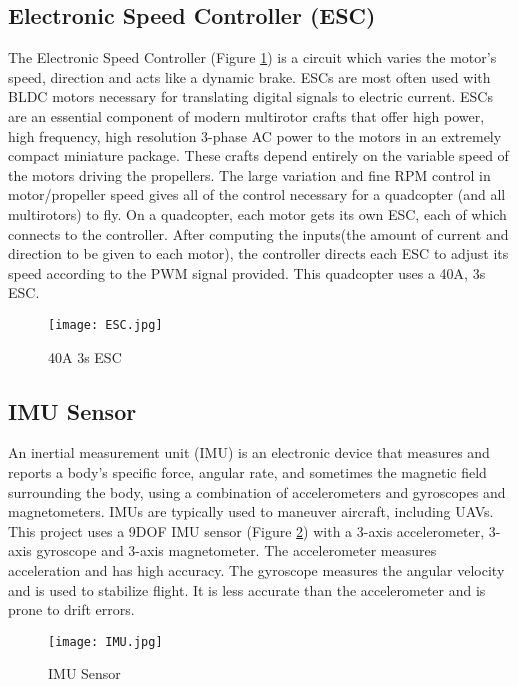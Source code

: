 \subsection{Electronic Speed Controller (ESC)}
The Electronic Speed Controller (Figure \ref{ESC}) is a circuit which varies the motor's speed, direction and acts like a dynamic brake. ESCs are most often used with BLDC motors necessary for translating digital signals to electric current. ESCs are an essential component of modern multirotor crafts that offer high power, high frequency, high resolution 3-phase AC power to the motors in an extremely compact miniature package. These crafts depend entirely on the variable speed of the motors driving the propellers. 
\newline
\newline
The large variation and fine RPM control in motor/propeller speed gives all of the control necessary for a quadcopter (and all multirotors) to fly. On a quadcopter, each motor gets its own ESC, each of which connects to the controller. After computing the inputs(the amount of current and direction to be given to each motor), the controller directs each ESC to adjust its speed according to the PWM signal provided.
This quadcopter uses a 40A, 3s ESC.
\begin{figure}[H]
  \centering
  \texttt{[image: ESC.jpg]}
  \caption{40A 3s ESC}  \label{ESC}	
\end{figure}



\subsection{IMU Sensor}
An inertial measurement unit (IMU) is an electronic device that measures and reports a body's specific force, angular rate, and sometimes the magnetic field surrounding the body, using a combination of accelerometers and gyroscopes and magnetometers. IMUs are typically used to maneuver aircraft, including UAVs. This project uses a 9DOF IMU sensor (Figure \ref{IMU}) with a 3-axis accelerometer, 3-axis gyroscope and 3-axis magnetometer. The accelerometer measures acceleration and has high accuracy. The gyroscope measures the angular velocity and is used to stabilize flight. It is less accurate than the accelerometer and is prone to drift errors. 
\begin{figure}[H]
  \centering
  \texttt{[image: IMU.jpg]}
  \caption{IMU Sensor}  
  \label{IMU}	
\end{figure}

